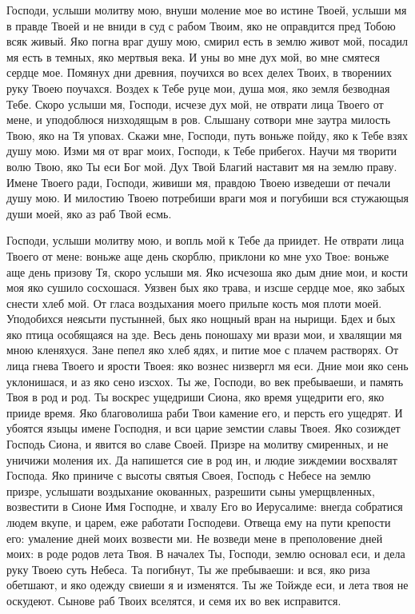 \begin{mymulticols}


Господи, услыши молитву мою, внуши моление мое во истине Твоей, услыши мя в правде Твоей и не вниди в суд с рабом Твоим, яко не оправдится пред Тобою всяк живый. Яко погна враг душу мою, смирил есть в землю живот мой, посадил мя есть в темных, яко мертвыя века. И уны во мне дух мой, во мне смятеся сердце мое. Помянух дни древния, поучихся во всех делех Твоих, в творениих руку Твоею поучахся. Воздех к Тебе руце мои, душа моя, яко земля безводная Тебе. Скоро услыши мя, Господи, исчезе дух мой, не отврати лица Твоего от мене, и уподоблюся низходящым в ров. Слышану сотвори мне заутра милость Твою, яко на Тя уповах. Скажи мне, Господи, путь воньже пойду, яко к Тебе взях душу мою. Изми мя от враг моих, Господи, к Тебе прибегох. Научи мя творити волю Твою, яко Ты еси Бог мой. Дух Твой Благий наставит мя на землю праву. Имене Твоего ради, Господи, живиши мя, правдою Твоею изведеши от печали душу мою. И милостию Твоею потребиши враги моя и погубиши вся стужающыя души моей, яко аз раб Твой есмь.




Господи, услыши молитву мою, и вопль мой к Тебе да приидет. Не отврати лица Твоего от мене: воньже аще день скорблю, приклони ко мне ухо Твое: воньже аще день призову Тя, скоро услыши мя. Яко исчезоша яко дым дние мои, и кости моя яко сушило сосхошася. Уязвен бых яко трава, и изсше сердце мое, яко забых снести хлеб мой. От гласа воздыхания моего прильпе кость моя плоти моей. Уподобихся неясыти пустынней, бых яко нощный вран на нырищи. Бдех и бых яко птица особящаяся на зде. Весь день поношаху ми врази мои, и хвалящии мя мною кленяхуся. Зане пепел яко хлеб ядях, и питие мое с плачем растворях. От лица гнева Твоего и ярости Твоея: яко вознес низвергл мя еси. Дние мои яко сень уклонишася, и аз яко сено изсхох. Ты же, Господи, во век пребываеши, и память Твоя в род и род. Ты воскрес ущедриши Сиона, яко время ущедрити его, яко прииде время. Яко благоволиша раби Твои камение его, и персть его ущедрят. И убоятся языцы имене Господня, и вси царие земстии славы Твоея. Яко созиждет Господь Сиона, и явится во славе Своей. Призре на молитву смиренных, и не уничижи моления их. Да напишется сие в род ин, и людие зиждемии восхвалят Господа. Яко приниче с высоты святыя Своея, Господь с Небесе на землю призре, услышати воздыхание окованных, разрешити сыны умерщвленных, возвестити в Сионе Имя Господне, и хвалу Его во Иерусалиме: внегда собратися людем вкупе, и царем, еже работати Господеви. Отвеща ему на пути крепости его: умаление дней моих возвести ми. Не возведи мене в преполовение дней моих: в роде родов лета Твоя. В началех Ты, Господи, землю основал еси, и дела руку Твоею суть Небеса. Та погибнут, Ты же пребываеши: и вся, яко риза обетшают, и яко одежду свиеши я и изменятся. Ты же Тойжде еси, и лета твоя не оскудеют. Сынове раб Твоих вселятся, и семя их во век исправится.

\end{mymulticols}

